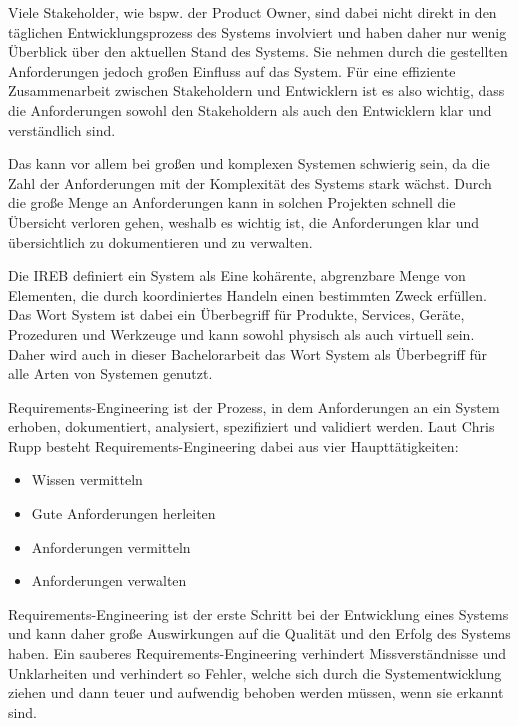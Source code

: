     Viele Stakeholder, wie bspw. der Product Owner, sind dabei nicht direkt in den täglichen Entwicklungsprozess des Systems involviert und haben daher nur wenig Überblick über den aktuellen Stand des Systems.
    Sie nehmen durch die gestellten Anforderungen jedoch großen Einfluss auf das System.
    Für eine effiziente Zusammenarbeit zwischen Stakeholdern und Entwicklern ist es also wichtig, dass die Anforderungen sowohl den Stakeholdern als auch den Entwicklern klar und verständlich sind.

    Das kann vor allem bei großen und komplexen Systemen schwierig sein, da die Zahl der Anforderungen mit der Komplexität des Systems stark wächst.
    Durch die große Menge an Anforderungen kann in solchen Projekten schnell die Übersicht verloren gehen, weshalb es wichtig ist, die Anforderungen klar und übersichtlich zu dokumentieren und zu verwalten.


    Die IREB definiert ein System als \glqq{}Eine kohärente, abgrenzbare Menge von Elementen, die durch koordiniertes Handeln einen bestimmten Zweck erfüllen.\grqq{} \autocite[][]{ireb_cpre_glossary}
    Das Wort System ist dabei ein Überbegriff für Produkte, Services, Geräte, Prozeduren und Werkzeuge und kann sowohl physisch als auch virtuell sein.
    Daher wird auch in dieser Bachelorarbeit das Wort System als Überbegriff für alle Arten von Systemen genutzt.


    Requirements-Engineering ist der Prozess, in dem Anforderungen an ein System erhoben, dokumentiert, analysiert, spezifiziert und validiert werden.
    Laut Chris Rupp besteht Requirements-Engineering dabei aus vier Haupttätigkeiten:
    \begin{itemize}
        \item Wissen vermitteln
        \item Gute Anforderungen herleiten
        \item Anforderungen vermitteln
        \item Anforderungen verwalten
    \end{itemize}
    Requirements-Engineering ist der erste Schritt bei der Entwicklung eines Systems und kann daher große Auswirkungen auf die Qualität und den Erfolg des Systems haben.
    Ein sauberes Requirements-Engineering verhindert Missverständnisse und Unklarheiten und verhindert so Fehler, welche sich durch die Systementwicklung ziehen und dann teuer und aufwendig behoben werden müssen, wenn sie erkannt sind.
    \autocite[][S.20]{Rupp2014}

